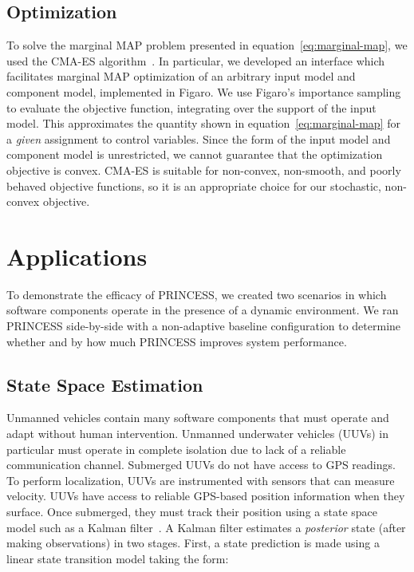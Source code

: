 \documentclass[letterpaper]{article}
\begin{document}
\subsection{Optimization}

To solve the marginal MAP problem presented in equation~\ref{eq:marginal-map}, we used the CMA-ES algorithm~\cite{hansen2003reducing}.
In particular, we developed an interface which facilitates marginal MAP optimization of an arbitrary input model and component model, implemented in Figaro.
We use Figaro's importance sampling to evaluate the objective function, integrating over the support of the input model.
This approximates the quantity shown in equation~\ref{eq:marginal-map} for a \emph{given} assignment to control variables.
Since the form of the input model and component model is unrestricted, we cannot guarantee that the optimization objective is convex.
CMA-ES is suitable for non-convex, non-smooth, and poorly behaved objective functions, so it is an appropriate choice for our stochastic, non-convex objective.


\section{Applications}

To demonstrate the efficacy of PRINCESS, we created two scenarios in which software components operate in the presence of a dynamic environment.
We ran PRINCESS side-by-side with a non-adaptive baseline configuration to determine whether and by how much PRINCESS improves system performance.

\subsection{State Space Estimation}

Unmanned vehicles contain many software components that must operate and adapt without human intervention.
Unmanned underwater vehicles (UUVs) in particular must operate in complete isolation due to lack of a reliable communication channel.
Submerged UUVs do not have access to GPS readings.
To perform localization, UUVs are instrumented with sensors that can measure velocity.
UUVs have access to reliable GPS-based position information when they surface.
Once submerged, they must track their position using a state space model such as a Kalman filter~\cite{murphy2012machine}.
A Kalman filter estimates a \emph{posterior} state (after making observations) in two stages.
First, a state prediction is made using a linear state transition model taking the form:
\end{document}
